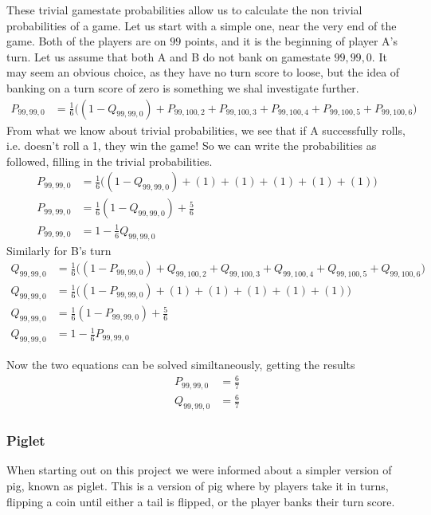 \documentclass[a4paper,titlepage]{article}
\begin{document}
These trivial gamestate probabilities allow us to calculate the non trivial probabilities of a game.
Let us start with a simple one, near the very end of the game. Both of the players are on $99$ points, and it is the beginning of player A's turn.
Let us assume that both A and B do not bank on gamestate $99,99,0$.
It may seem an obvious choice, as they have no turn score to loose, but the idea of banking on a turn score of zero is something we shal investigate further.
\begin{align*}
	P_{99,99,0} &= \frac{1}{6}\bigg((1 - Q_{99,99,0}) + P_{99,100,2} + P_{99,100,3} + P_{99,100,4} + P_{99,100,5} + P_{99,100,6}\bigg)
\end{align*}
From what we know about trivial probabilities, we see that if A successfully rolls, i.e. doesn't roll a 1, they win the game!
So we can write the probabilities as followed, filling in the trivial probabilities.
\begin{align*}
	P_{99,99,0} &= \frac{1}{6}\bigg((1 - Q_{99,99,0}) + (1) + (1) + (1) + (1) + (1)\bigg)\\
	P_{99,99,0} &= \frac{1}{6}(1 - Q_{99,99,0})+\frac{5}{6}\\
	P_{99,99,0} &= 1 - \frac{1}{6}Q_{99,99,0}
\end{align*}
Similarly for B's turn
\begin{align*}
	Q_{99,99,0} &= \frac{1}{6}\bigg((1 - P_{99,99,0}) + Q_{99,100,2} + Q_{99,100,3} + Q_{99,100,4} + Q_{99,100,5} + Q_{99,100,6}\bigg)\\
	Q_{99,99,0} &= \frac{1}{6}\bigg((1 - P_{99,99,0}) + (1) + (1) + (1) + (1) + (1)\bigg)\\
	Q_{99,99,0} &= \frac{1}{6}(1 - P_{99,99,0})+\frac{5}{6}\\
	Q_{99,99,0} &= 1 - \frac{1}{6}P_{99,99,0}
\end{align*}

Now the two equations can be solved similtaneously, getting the results
\begin{align*}
	P_{99,99,0} &= \frac{6}{7}\\
	Q_{99,99,0} &= \frac{6}{7}
\end{align*}





\subsubsection{Piglet}
When starting out on this project we were informed about a simpler version of pig, known as piglet. This is a version of pig
where by players take it in turns, flipping a coin until either a tail is flipped, or the player banks their turn score.
\end{document}
